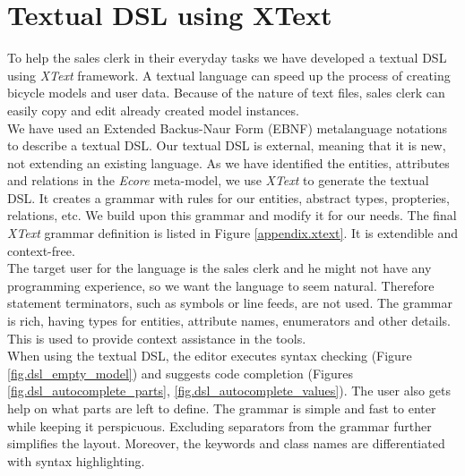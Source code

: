 \section{Textual DSL using XText}
\label{sec.xtext}

\noindent
To help the sales clerk in their everyday tasks we have developed a textual DSL
using \emph{XText} framework. A textual language can speed up the process of
creating bicycle models and user data. Because of the nature of text files,
sales clerk can easily copy and edit already created model instances.\\

\noindent
We have used an Extended Backus-Naur Form (EBNF)
metalanguage notations to describe a textual DSL. Our textual DSL is external,
meaning that it is new, not extending an existing language. As we have
identified the entities, attributes and relations in the \emph{Ecore} meta-model, we use
\emph{XText} to generate the textual DSL. It creates a grammar with rules for
our entities, abstract types, propteries, relations, etc. We build upon this grammar and modify it for our needs. The final \emph{XText} grammar definition is listed in Figure
\ref{appendix.xtext}. It is extendible and context-free.\\

\noindent
The target user for the language is the sales clerk and he might not
have any programming experience, so we want the language to seem
natural. Therefore statement terminators, such as symbols or line feeds, are not
used. The grammar is rich, having types for entities, attribute
names, enumerators and other details. This is used to provide context assistance
in the tools.\\

\noindent
When using the textual DSL, the editor executes syntax checking (Figure
\ref{fig.dsl_empty_model}) and suggests code completion (Figures \ref{fig.dsl_autocomplete_parts},
\ref{fig.dsl_autocomplete_values}). The user also gets help on what parts
are left to define. The grammar is simple and fast to enter while keeping it
perspicuous. Excluding separators from the grammar further simplifies the layout.
Moreover, the keywords and class names are differentiated with syntax
highlighting.\\
